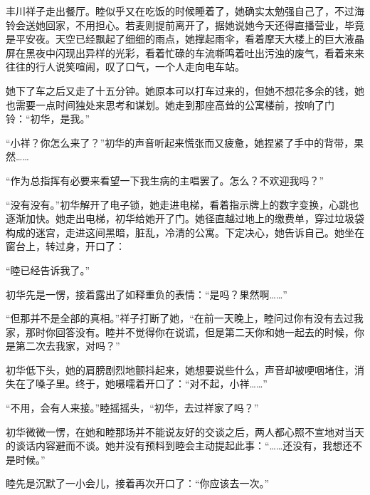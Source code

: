 \documentclass{article}
\begin{document}
\newpage



丰川祥子走出餐厅。睦似乎又在吃饭的时候睡着了，她确实太勉强自己了，不过海铃会送她回家，不用担心。若麦则提前离开了，据她说她今天还得直播营业，毕竟是平安夜。天空已经飘起了细细的雨点，她撑起雨伞，看着摩天大楼上的巨大液晶屏在黑夜中闪现出异样的光彩，看着忙碌的车流嘶鸣着吐出污浊的废气，看着来来往往的行人说笑喧闹，叹了口气，一个人走向电车站。



她下了车之后又走了十五分钟。她原本可以打车过来的，但她不想花多余的钱，她也需要一点时间独处来思考和谋划。她走到那座高耸的公寓楼前，按响了门铃：“初华，是我。”



“小祥？你怎么来了？”初华的声音听起来慌张而又疲惫，她捏紧了手中的背带，果然……



“作为总指挥有必要来看望一下我生病的主唱罢了。怎么？不欢迎我吗？”



“没有没有。”初华解开了电子锁，她走进电梯，看着指示牌上的数字变换，心跳也逐渐加快。她走出电梯，初华给她开了门。她径直越过地上的缴费单，穿过垃圾袋构成的迷宫，走进这间黑暗，脏乱，冷清的公寓。下定决心，她告诉自己。她坐在窗台上，转过身，开口了：



“睦已经告诉我了。”



初华先是一愣，接着露出了如释重负的表情：“是吗？果然啊……”



“但那并不是全部的真相。”祥子打断了她，“在前一天晚上，睦问过你有没有去过我家，那时你回答没有。睦并不觉得你在说谎，但是第二天你和她一起去的时候，你是第二次去我家，对吗？”



初华低下头，她的肩膀剧烈地颤抖起来，她想要说些什么，声音却被哽咽堵住，消失在了嗓子里。终于，她嗫嚅着开口了：“对不起，小祥……”



\newpage



“不用，会有人来接。”睦摇摇头，“初华，去过祥家了吗？”



初华微微一愣，在她和睦那场并不能说友好的交谈之后，两人都心照不宣地对当天的谈话内容避而不谈。她并没有预料到睦会主动提起此事：“……还没有，我想还不是时候。”



睦先是沉默了一小会儿，接着再次开口了：“你应该去一次。”
\end{document}
